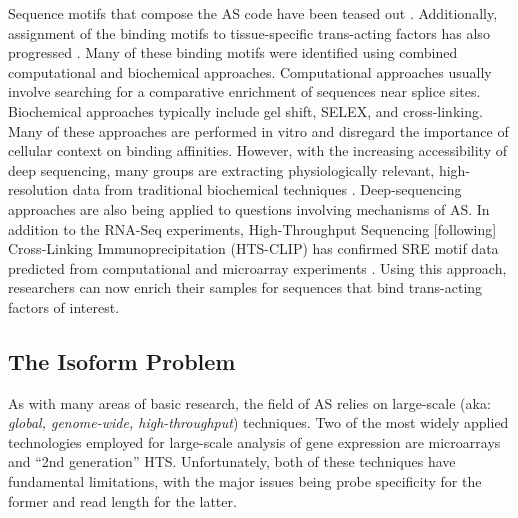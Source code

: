     Sequence motifs that compose the AS code have been teased out \citep{Ladd2002, Barash2010}. Additionally, assignment of the binding motifs to tissue-specific trans-acting factors has also progressed \citep{Jin2003,Ule2005,Licatalosi2008}. Many of these binding motifs were identified using combined computational and biochemical approaches. Computational approaches usually involve searching for a comparative enrichment of sequences near splice sites. Biochemical approaches typically include gel shift, SELEX, and cross-linking. Many of these approaches are performed in vitro and disregard the importance of cellular context on binding affinities. However, with the increasing accessibility of deep sequencing, many groups are extracting physiologically relevant, high-resolution data from traditional biochemical techniques \citep{Ingolia2009, Ingolia2011}. Deep-sequencing approaches are also being applied to questions involving mechanisms of AS. In addition to the RNA-Seq experiments, High-Throughput Sequencing [following] Cross-Linking Immunoprecipitation (HTS-CLIP) has confirmed SRE motif data predicted from computational and microarray experiments \citep{Licatalosi2008,Hafner2010}. Using this approach, researchers can now enrich their samples for sequences that bind trans-acting factors of interest. 

  \subsection{The Isoform Problem}\label{sec:Isoform Problem}

    As with many areas of basic research, the field of AS relies on large-scale (aka: \textit{global, genome-wide, high-throughput}) techniques. Two of the most widely applied technologies employed for large-scale analysis of gene expression are microarrays and ``2nd generation'' HTS. Unfortunately, both of these techniques have fundamental limitations, with the major issues being probe specificity for the former and read length for the latter.

